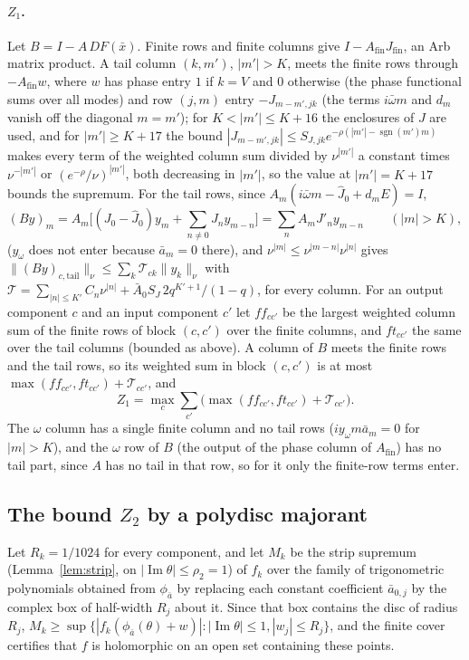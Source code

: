 \documentclass[11pt]{article}
\theoremstyle{definition}
\newcommand{\im}{\operatorname{Im}}
\begin{document}
\paragraph{$Z_1$.} Let $B = I - A\,DF(\bar x)$. Finite rows and finite columns give $I - A_{\mathrm{fin}}J_{\mathrm{fin}}$, an Arb matrix product. A tail column $(k, m')$, $|m'| > K$, meets the finite rows through $-A_{\mathrm{fin}}w$, where $w$ has phase entry $1$ if $k = V$ and $0$ otherwise (the phase functional sums over all modes) and row $(j, m)$ entry $-J_{m-m',jk}$ (the terms $i\bar\omega m$ and $d_m$ vanish off the diagonal $m = m'$); for $K < |m'| \le K + 16$ the enclosures of $J$ are used, and for $|m'| \ge K + 17$ the bound $|J_{m-m',jk}| \le S_{J,jk}e^{-\rho(|m'| - \operatorname{sgn}(m')m)}$ makes every term of the weighted column sum divided by $\nu^{|m'|}$ a constant times $\nu^{-|m'|}$ or $(e^{-\rho}/\nu)^{|m'|}$, both decreasing in $|m'|$, so the value at $|m'| = K + 17$ bounds the supremum. For the tail rows, since $A_m(i\bar\omega m - \hat J_0 + d_m E) = I$,
\[ (By)_m = A_m\Big[(J_0 - \hat J_0)y_m + \sum_{n\ne0} J_n y_{m-n}\Big] = \sum_n A_m J'_n y_{m-n} \qquad (|m| > K), \]
($y_\omega$ does not enter because $\bar a_m = 0$ there), and $\nu^{|m|} \le \nu^{|m-n|}\nu^{|n|}$ gives $\|(By)_{c,\mathrm{tail}}\|_\nu \le \sum_k \mathcal T_{ck}\|y_k\|_\nu$ with $\mathcal T = \sum_{|n| \le K'} C_n\nu^{|n|} + \bar A_0 S_J\, 2q^{K'+1}/(1 - q)$, for every column. For an output component $c$ and an input component $c'$ let $f\!f_{cc'}$ be the largest weighted column sum of the finite rows of block $(c, c')$ over the finite columns, and $f\!t_{cc'}$ the same over the tail columns (bounded as above). A column of $B$ meets the finite rows and the tail rows, so its weighted sum in block $(c,c')$ is at most $\max(f\!f_{cc'}, f\!t_{cc'}) + \mathcal T_{cc'}$, and
\[ Z_1 = \max_c\sum_{c'}\big(\max(f\!f_{cc'}, f\!t_{cc'}) + \mathcal T_{cc'}\big). \]
The $\omega$ column has a single finite column and no tail rows ($iy_\omega m\bar a_m = 0$ for $|m| > K$), and the $\omega$ row of $B$ (the output of the phase column of $A_{\mathrm{fin}}$) has no tail part, since $A$ has no tail in that row, so for it only the finite-row terms enter.

\subsection{The bound \texorpdfstring{$Z_2$}{Z2} by a polydisc majorant}\label{sec:Z2}

Let $R_k = 1/1024$ for every component, and let $M_k$ be the strip supremum (Lemma~\ref{lem:strip}, on $|\im\theta| \le \rho_2 = 1$) of $f_k$ over the family of trigonometric polynomials obtained from $\phi_{\bar a}$ by replacing each constant coefficient $\bar a_{0,j}$ by the complex box of half-width $R_j$ about it. Since that box contains the disc of radius $R_j$, $M_k \ge \sup\{|f_k(\phi_{\bar a}(\theta) + w)| : |\im\theta| \le 1, |w_j| \le R_j\}$, and the finite cover certifies that $f$ is holomorphic on an open set containing these points.
\end{document}
